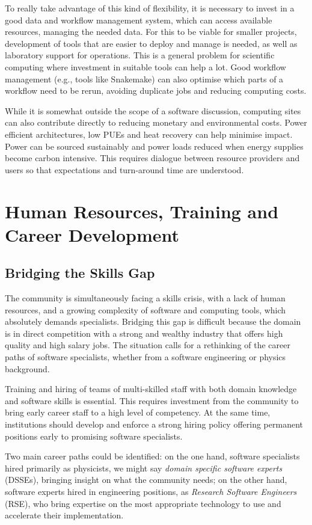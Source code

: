 To really take advantage of this kind of flexibility, it is necessary to invest in a good data and workflow management system, which can access available resources, managing the needed data. For this to be viable for smaller projects, development of tools that are easier to deploy and manage is needed, as well as laboratory support for operations. This is a general problem for scientific computing where investment in suitable tools can help a lot. Good workflow management (e.g., tools like Snakemake) can also optimise which parts of a workflow need to be rerun, avoiding duplicate jobs and reducing computing costs.

While it is somewhat outside the scope of a software discussion, computing sites can also contribute directly to reducing monetary and environmental costs. Power efficient architectures, low PUEs and heat recovery can help minimise impact. Power can be sourced sustainably and power loads reduced when energy supplies become carbon intensive. This requires dialogue between resource providers and users so that expectations and turn-around time are understood.


\section{Human Resources, Training and Career Development}

\subsection{Bridging the Skills Gap}

The community is simultaneously facing a skills crisis, with a lack of human resources, and a growing complexity of software and computing tools, which absolutely demands specialists. Bridging this gap is difficult because the domain is in direct competition with a strong and wealthy industry that offers high quality and high salary jobs. The situation calls for a rethinking of the career paths of software specialists, whether from a software engineering or physics background.

Training and hiring of teams of multi-skilled staff with both domain knowledge and software skills is essential. This requires investment from the community to bring early career staff to a high level of competency. At the same time, institutions should develop and enforce a strong hiring policy offering permanent positions early to promising software specialists.

Two main career paths could be identified: on the one hand, software specialists hired primarily as physicists, we might say \emph{domain specific software experts} (DSSEs), bringing insight on what the community needs; on the other hand, software experts hired in engineering positions, as \emph{Research Software Engineers} (RSE), who bring expertise on the most appropriate technology to use and accelerate their implementation.

